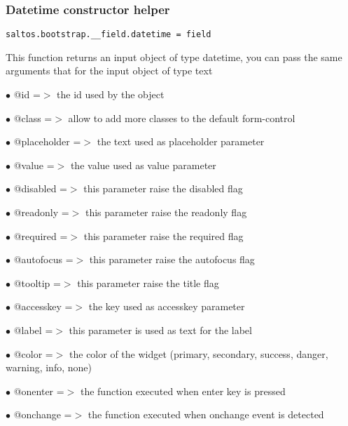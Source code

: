 \documentclass[a4paper]{article}
\begin{document}
\hypertarget{toc615}{}
\subsubsection{Datetime constructor helper}

\begin{lstlisting}
saltos.bootstrap.__field.datetime = field
\end{lstlisting}

This function returns an input object of type datetime, you can pass the same arguments
that for the input object of type text

\begin{compactitem}
\item[\color{myblue}$\bullet$] @id          =$>$ the id used by the object
\item[\color{myblue}$\bullet$] @class       =$>$ allow to add more classes to the default form-control
\item[\color{myblue}$\bullet$] @placeholder =$>$ the text used as placeholder parameter
\item[\color{myblue}$\bullet$] @value       =$>$ the value used as value parameter
\item[\color{myblue}$\bullet$] @disabled    =$>$ this parameter raise the disabled flag
\item[\color{myblue}$\bullet$] @readonly    =$>$ this parameter raise the readonly flag
\item[\color{myblue}$\bullet$] @required    =$>$ this parameter raise the required flag
\item[\color{myblue}$\bullet$] @autofocus   =$>$ this parameter raise the autofocus flag
\item[\color{myblue}$\bullet$] @tooltip     =$>$ this parameter raise the title flag
\item[\color{myblue}$\bullet$] @accesskey   =$>$ the key used as accesskey parameter
\item[\color{myblue}$\bullet$] @label       =$>$ this parameter is used as text for the label
\item[\color{myblue}$\bullet$] @color       =$>$ the color of the widget (primary, secondary, success, danger, warning, info, none)
\item[\color{myblue}$\bullet$] @onenter     =$>$ the function executed when enter key is pressed
\item[\color{myblue}$\bullet$] @onchange    =$>$ the function executed when onchange event is detected
\end{compactitem}
\end{document}
